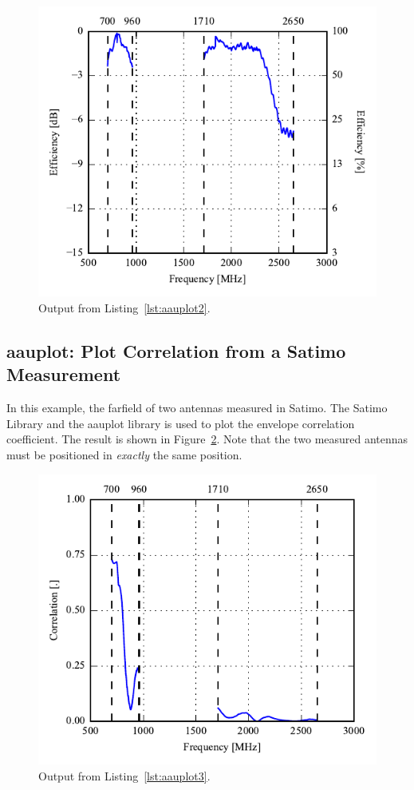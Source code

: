 

\begin{figure}[htbp]
    \centering
    \includegraphics{sec/post_processing/examples_aauplot/ex2_efficiency}
    \caption{Output from Listing~\ref{lst:aauplot2}.}
    \label{fig:aauplot_ex2}
\end{figure}

\subsection{aauplot: Plot Correlation from a Satimo Measurement}
In this example, the farfield of two antennas measured in Satimo. The Satimo Library and the aauplot library is used to plot the envelope correlation coefficient. The result is shown in Figure~\ref{fig:aauplot_ex3}. Note that the two measured antennas must be positioned in \emph{exactly} the same position.



\begin{figure}[htbp]
    \centering
    \includegraphics{sec/post_processing/examples_aauplot/ex3_correlation}
    \caption{Output from Listing~\ref{lst:aauplot3}.}
    \label{fig:aauplot_ex3}
\end{figure}
